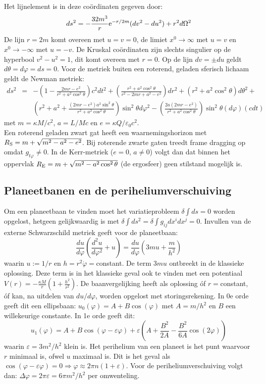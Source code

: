 \documentclass[twoside]{report}
\begin{document}
Het lijnelement is in deze co\"ordinaten gegeven door:
\[
ds^2=-\frac{32m^3}{r}{\rm e}^{-r/2m}(dv^2-du^2)+r^2d\Omega^2
\]
De lijn $r=2m$ komt overeen met $u=v=0$, de limiet $x^0\rightarrow\infty$ met
$u=v$ en $x^0\rightarrow-\infty$ met $u=-v$. De Kruskal co\"ordinaten zijn
slechts singulier op de hyperbool $v^2-u^2=1$, dit komt overeen met $r=0$.
Op de lijn $dv=\pm du$ geldt $d\theta=d\varphi=ds=0$.
\npar
Voor de metriek buiten een roterend, geladen sferisch lichaam geldt de Newman
metriek:
\begin{eqnarray*}
ds^2&=&-\left(1-\frac{2mr-e^2}{r^2+a^2\cos^2\theta}\right)c^2dt^2+
  \left(\frac{r^2+a^2\cos^2\theta}{r^2-2mr+a^2-e^2}\right)dr^2+
  (r^2+a^2\cos^2\theta)d\theta^2+\\
&&\left(r^2+a^2+\frac{(2mr-e^2)a^2\sin^2\theta}{r^2+a^2\cos^2\theta}\right)\sin^2\theta d\varphi^2-
  \left(\frac{2a(2mr-e^2)}{r^2+a^2\cos^2\theta}\right)\sin^2\theta(d\varphi)(cdt)
\end{eqnarray*}
met $m=\kappa M/c^2$, $a=L/Mc$ en $e=\kappa Q/\varepsilon_0c^2$.\\
Een roterend geladen zwart gat heeft een waarnemingshorizon met
$R_{\rm S}=m+\sqrt{m^2-a^2-e^2}$.
\npar
Bij roterende zwarte gaten treedt frame dragging op omdat $g_{t\varphi}\neq0$.
In de Kerr-metriek ($e=0$, $a\neq0$) volgt dan dat binnen het oppervlak
$R_{\rm E}=m+\sqrt{m^2-a^2\cos^2\theta}$ (de ergosfeer) geen stilstand
mogelijk is.

\subsection{Planeetbanen en de periheliumverschuiving}
Om een planeetbaan te vinden moet het variatieprobleem $\delta\int ds=0$
worden opgelost, hetgeen gelijkwaardig is met $\delta\int ds^2=\delta\int g_{ij}dx^idx^j=0$.
Invullen van de externe Schwarzschild metriek geeft voor de planeetbaan:
\[
\frac{du}{d\varphi}\left(\frac{d^2u}{d\varphi^2}+u\right)=\frac{du}{d\varphi}\left(3mu+\frac{m}{h^2}\right)
\]
waarin $u:=1/r$ en $h=r^2\dot{\varphi}=$constant. De term $3mu$ ontbreekt in
de klassieke oplossing. Deze term is in het klassieke geval ook te vinden met
een potentiaal $\displaystyle V(r)=-\frac{\kappa M}{r}\left(1+\frac{h^2}{r^2}\right)$.
\npar
De baanvergelijking heeft als oplossing \'of $r=$constant, \'of kan, na
uitdelen van $du/d\varphi$, worden opgelost met storingsrekening. In 0e orde
geeft dit een ellipsbaan: $u_0(\varphi)=A+B\cos(\varphi)$ met $A=m/h^2$ en
$B$ een willekeurige constante. In 1e orde geeft dit:
\[
u_1(\varphi)=A+B\cos(\varphi-\varepsilon\varphi)+\varepsilon
\left(A+\frac{B^2}{2A}-\frac{B^2}{6A}\cos(2\varphi)\right)
\]
waarin $\varepsilon=3m^2/h^2$ klein is. Het perihelium van een planeet is het
punt waarvoor $r$ minimaal is, ofwel $u$ maximaal is. Dit is het geval als
$\cos(\varphi-\varepsilon\varphi)=0\Rightarrow\varphi\approx2\pi n(1+\varepsilon)$.
Voor de periheliumverschuiving volgt dan:
$\Delta\varphi=2\pi\varepsilon=6\pi m^2/h^2$ per omwenteling.
\end{document}
